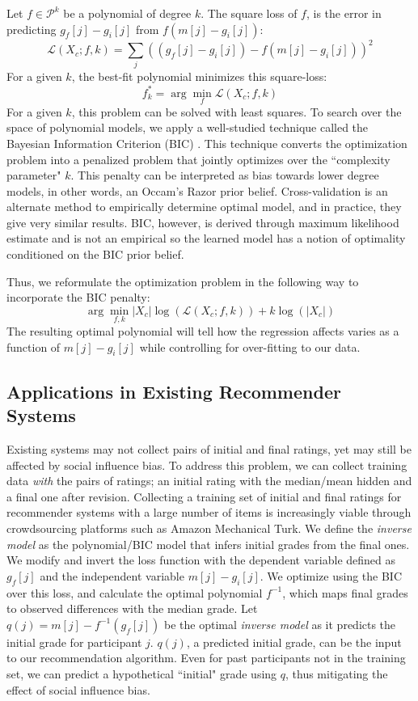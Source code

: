 Let $f\in \mathcal{P}^k$ be a polynomial of degree $k$.
The square loss of $f$, is the error in predicting $g_f[j] - g_i[j]$ from $f(m[j] - g_i[j])$:
\begin{equation}
\mathcal{L}(X_c;f,k) = \sum_j ((g_f[j] - g_i[j]) - f(m[j] - g_i[j]))^2 
\end{equation}
For a given $k$, the best-fit polynomial minimizes this square-loss:
\begin{equation}
f^*_k =\arg \min_f \mathcal{L}(X_c;f,k)
\end{equation}
For a given $k$, this problem can be solved with least squares.
To search over the space of polynomial models, we apply a well-studied technique called the Bayesian Information Criterion (BIC) \cite{schwarz1978estimating,burnham2002model}.
This technique converts the optimization problem into a penalized problem that jointly optimizes over the ``complexity parameter" $k$.
This penalty can be interpreted as bias towards lower degree models, in other words, an Occam's Razor prior belief. 
Cross-validation is an alternate method to empirically determine optimal model, and in practice, they give very similar results.
BIC, however, is derived through maximum likelihood estimate and is not an empirical so the learned model has a notion of optimality conditioned on the BIC prior belief.

Thus, we reformulate the optimization problem in the following way to incorporate the BIC penalty:
\begin{equation}
\arg \min_{f,k} |X_c|\log(\mathcal{L}(X_c;f,k)) + k\log(|X_c|)
\end{equation}
The resulting optimal polynomial will tell how the regression affects varies as a function of $m[j] - g_i[j]$ while controlling for over-fitting to our data.
\subsection{Applications in Existing Recommender Systems}
Existing systems may not collect pairs of initial and final ratings, yet may still be affected by social influence bias.
To address this problem, we can collect training data \emph{with} the pairs of ratings; an initial rating with the median/mean hidden and a final one after revision.
Collecting a training set of initial and final ratings for recommender systems with a large number of items is increasingly viable through crowdsourcing platforms such as Amazon Mechanical Turk.
We define the \emph{inverse model} as the polynomial/BIC model that infers initial grades from the final ones.
We modify and invert the loss function with the dependent variable defined as $g_f[j]$ and the independent variable $m[j] - g_i[j]$.
We optimize using the BIC over this loss, and calculate the optimal polynomial $f^{-1}$, which maps final grades to observed differences with the median grade.
Let $q(j) = m[j] - f^{-1}(g_f[j])$ be the optimal \emph{inverse model} as it predicts the initial grade for participant $j$.
$q(j)$, a predicted initial grade, can be the input to our recommendation algorithm.
Even for past participants not in the training set, we can predict a hypothetical ``initial" grade using $q$, thus mitigating the effect of social influence bias.


